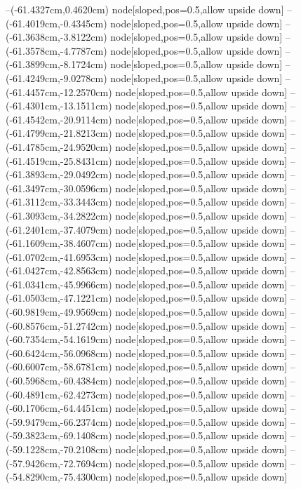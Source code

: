 --(-61.4327cm,0.4620cm) node[sloped,pos=0.5,allow upside down]{\ArrowIn}
--(-61.4019cm,-0.4345cm) node[sloped,pos=0.5,allow upside down]{\arrowIn}
--(-61.3638cm,-3.8122cm) node[sloped,pos=0.5,allow upside down]{\ArrowIn}
--(-61.3578cm,-4.7787cm) node[sloped,pos=0.5,allow upside down]{\arrowIn}
--(-61.3899cm,-8.1724cm) node[sloped,pos=0.5,allow upside down]{\ArrowIn}
--(-61.4249cm,-9.0278cm) node[sloped,pos=0.5,allow upside down]{\arrowIn}
--(-61.4457cm,-12.2570cm) node[sloped,pos=0.5,allow upside down]{\ArrowIn}
--(-61.4301cm,-13.1511cm) node[sloped,pos=0.5,allow upside down]{\arrowIn}
--(-61.4542cm,-20.9114cm) node[sloped,pos=0.5,allow upside down]{\ArrowIn}
--(-61.4799cm,-21.8213cm) node[sloped,pos=0.5,allow upside down]{\arrowIn}
--(-61.4785cm,-24.9520cm) node[sloped,pos=0.5,allow upside down]{\ArrowIn}
--(-61.4519cm,-25.8431cm) node[sloped,pos=0.5,allow upside down]{\arrowIn}
--(-61.3893cm,-29.0492cm) node[sloped,pos=0.5,allow upside down]{\ArrowIn}
--(-61.3497cm,-30.0596cm) node[sloped,pos=0.5,allow upside down]{\ArrowIn}
--(-61.3112cm,-33.3443cm) node[sloped,pos=0.5,allow upside down]{\ArrowIn}
--(-61.3093cm,-34.2822cm) node[sloped,pos=0.5,allow upside down]{\arrowIn}
--(-61.2401cm,-37.4079cm) node[sloped,pos=0.5,allow upside down]{\ArrowIn}
--(-61.1609cm,-38.4607cm) node[sloped,pos=0.5,allow upside down]{\ArrowIn}
--(-61.0702cm,-41.6953cm) node[sloped,pos=0.5,allow upside down]{\ArrowIn}
--(-61.0427cm,-42.8563cm) node[sloped,pos=0.5,allow upside down]{\ArrowIn}
--(-61.0341cm,-45.9966cm) node[sloped,pos=0.5,allow upside down]{\ArrowIn}
--(-61.0503cm,-47.1221cm) node[sloped,pos=0.5,allow upside down]{\ArrowIn}
--(-60.9819cm,-49.9569cm) node[sloped,pos=0.5,allow upside down]{\ArrowIn}
--(-60.8576cm,-51.2742cm) node[sloped,pos=0.5,allow upside down]{\ArrowIn}
--(-60.7354cm,-54.1619cm) node[sloped,pos=0.5,allow upside down]{\ArrowIn}
--(-60.6424cm,-56.0968cm) node[sloped,pos=0.5,allow upside down]{\ArrowIn}
--(-60.6007cm,-58.6781cm) node[sloped,pos=0.5,allow upside down]{\ArrowIn}
--(-60.5968cm,-60.4384cm) node[sloped,pos=0.5,allow upside down]{\ArrowIn}
--(-60.4891cm,-62.4273cm) node[sloped,pos=0.5,allow upside down]{\ArrowIn}
--(-60.1706cm,-64.4451cm) node[sloped,pos=0.5,allow upside down]{\ArrowIn}
--(-59.9479cm,-66.2374cm) node[sloped,pos=0.5,allow upside down]{\ArrowIn}
--(-59.3823cm,-69.1408cm) node[sloped,pos=0.5,allow upside down]{\ArrowIn}
--(-59.1228cm,-70.2108cm) node[sloped,pos=0.5,allow upside down]{\ArrowIn}
--(-57.9426cm,-72.7694cm) node[sloped,pos=0.5,allow upside down]{\ArrowIn}
--(-54.8290cm,-75.4300cm) node[sloped,pos=0.5,allow upside down]{\ArrowIn}
